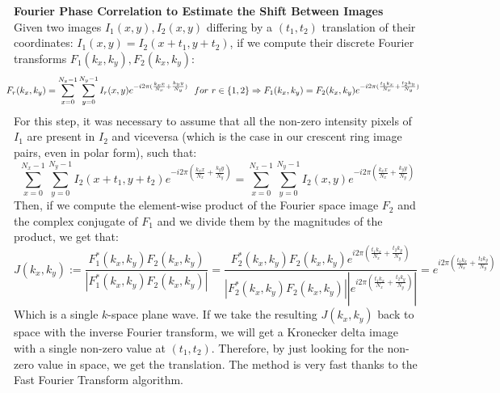 \documentclass[11pt, a4paper, twoside]{article} %
\DeclareRobustCommand{\mybox}[2][gray!10]{%
\begin{tcolorbox}[   %
        left=0.2cm,
        right=0.2cm,
        top=0.15cm,
        bottom=0.15cm,
        colback=#1,
        colframe=#1,
        width=\dimexpr\textwidth\relax, 
        enlarge left by=0mm,
        boxsep=5pt,
        arc=0pt,outer arc=0pt,
        ]
        #2
\end{tcolorbox}
}
\begin{document}
\mybox{{\bf Fourier Phase Correlation to Estimate the Shift Between Images\vspace{0.2cm}}\\
Given two images $I_1(x,y),I_2(x,y)$ differing by a $(t_1,t_2)$ translation of their coordinates: $I_1(x,y)=I_2(x+t_1,y+t_2)$, if we compute their discrete Fourier transforms $F_1(k_x,k_y),F_2(k_x,k_y)$:
\begin{equation}
\hspace*{-0.3cm}F_r(k_x,k_y)=\sum_{x=0}^{N_x-1}\sum_{y=0}^{N_y-1}I_r(x,y)e^{-i2\pi(\frac{k_xx}{N_x}+\frac{k_yy}{N_y})} \ \ for\ r\in\{1,2\}\Rightarrow F_1(k_x,k_y)=F_2(k_x,k_y)e^{-i2\pi(\frac{t_1k_x}{N_x}+\frac{t_2k_y}{N_y})}
\end{equation}
For this step, it was necessary to assume that all the non-zero intensity pixels of $I_1$ are present in $I_2$ and viceversa (which is the case in our crescent ring image pairs, even in polar form), such that:
\begin{equation}
\sum_{x=0}^{N_x-1}\sum_{y=0}^{N_y-1}I_2(x+t_1,y+t_2)e^{-i2\pi(\frac{k_xx}{N_x}+\frac{k_yy}{N_y})}=\sum_{x=0}^{N_x-1}\sum_{y=0}^{N_y-1}I_2(x,y)e^{-i2\pi(\frac{k_xx}{N_x}+\frac{k_yy}{N_y})}
\end{equation} 
Then, if we compute the element-wise product of the Fourier space image $F_2$ and the complex conjugate of $F_1$ and we divide them by the magnitudes of the product, we get that:
\begin{equation}
J(k_x,k_y):=\frac{F_1^*(k_x,k_y)F_2(k_x,k_y)}{|F_1^*(k_x,k_y)F_2(k_x,k_y)|}=\frac{F_2^*(k_x,k_y)F_2(k_x,k_y)e^{i2\pi(\frac{t_1k_x}{N_x}+\frac{t_2k_y}{N_y})}}{|F_2^*(k_x,k_y)F_2(k_x,k_y)||e^{i2\pi(\frac{t_1k_x}{N_x}+\frac{t_2k_y}{N_y})}|}=e^{i2\pi(\frac{t_1k_x}{N_x}+\frac{t_2k_y}{N_y})}
\end{equation}
Which is a single $k$-space plane wave. If we take the resulting $J(k_x,k_y)$ back to space with the inverse Fourier transform, we will get a Kronecker delta image with a single non-zero value at $(t_1,t_2)$. Therefore, by just looking for the non-zero value in space, we get the translation. The method is very fast thanks to the Fast Fourier Transform algorithm.
}
\end{document}
